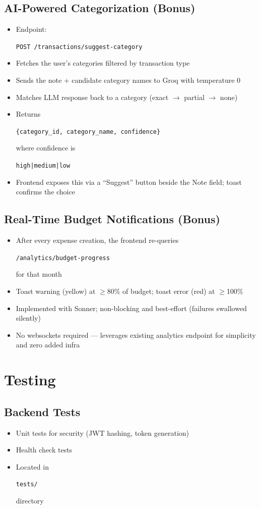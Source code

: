 \documentclass[11pt,a4paper]{article}
\newcommand{\code}[1]{\colorbox{codebg}{\strut\texttt{\small #1}}}
\begin{document}
\subsection{AI-Powered Categorization (Bonus)}
\begin{itemize}[leftmargin=*,itemsep=1pt]
  \item Endpoint: \code{POST /transactions/suggest-category}
  \item Fetches the user's categories filtered by transaction type
  \item Sends the note + candidate category names to Groq with temperature 0
  \item Matches LLM response back to a category (exact $\rightarrow$ partial $\rightarrow$ none)
  \item Returns \code{\{category\_id, category\_name, confidence\}} where confidence is \code{high|medium|low}
  \item Frontend exposes this via a ``Suggest'' button beside the Note field; toast confirms the choice
\end{itemize}

\subsection{Real-Time Budget Notifications (Bonus)}
\begin{itemize}[leftmargin=*,itemsep=1pt]
  \item After every expense creation, the frontend re-queries \code{/analytics/budget-progress} for that month
  \item Toast warning (yellow) at $\geq$80\% of budget; toast error (red) at $\geq$100\%
  \item Implemented with Sonner; non-blocking and best-effort (failures swallowed silently)
  \item No websockets required --- leverages existing analytics endpoint for simplicity and zero added infra
\end{itemize}

\section{Testing}

\subsection{Backend Tests}
\begin{itemize}[leftmargin=*,itemsep=1pt]
  \item Unit tests for security (JWT hashing, token generation)
  \item Health check tests
  \item Located in \code{tests/} directory
\end{itemize}
\end{document}
